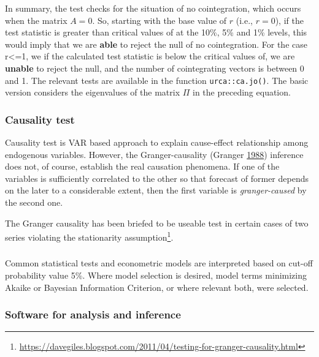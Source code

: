 \documentclass[12pt,]{article}
\begin{document}
In summary, the test checks for the situation of no cointegration, which occurs when the matrix \(A=0\). So, starting with the base value of \(r\) (i.e., \(r=0\)), if the test statistic is greater than critical values of at the 10\%, 5\% and 1\% levels, this would imply that we are \textbf{able} to reject the null of no cointegration. For the case r\textless{}=1, we if the calculated test statistic is below the critical values of, we are \textbf{unable} to reject the null, and the number of cointegrating vectors is between 0 and 1. The relevant tests are available in the function \texttt{urca::ca.jo()}. The basic version considers the eigenvalues of the matrix \(\Pi\) in the preceding equation.

\hypertarget{causality-test}{%
\subsubsection{Causality test}\label{causality-test}}

Causality test is VAR based approach to explain cause-effect relationship among endogenous variables. However, the Granger-causality (Granger \protect\hyperlink{ref-granger1988causality}{1988}) inference does not, of course, establish the real causation phenomena. If one of the variables is sufficiently correlated to the other so that forecast of former depends on the later to a considerable extent, then the first variable is \emph{granger-caused} by the second one.

The Granger causality has been briefed to be useable test in certain cases of two series violating the stationarity assumption\footnote{\url{https://davegiles.blogspot.com/2011/04/testing-for-granger-causality.html}}.

\hypertarget{section}{%
\subsubsection{}\label{section}}

Common statistical tests and econometric models are interpreted based on cut-off probability value 5\%. Where model selection is desired, model terms minimizing Akaike or Bayesian Information Criterion, or where relevant both, were selected.

\hypertarget{software-for-analysis-and-inference}{%
\subsubsection{Software for analysis and inference}\label{software-for-analysis-and-inference}}
\end{document}

